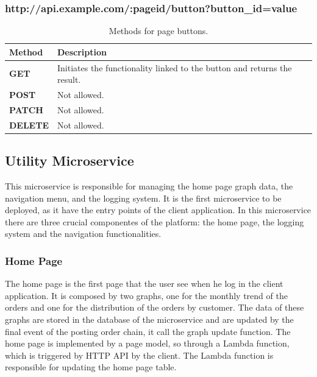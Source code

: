 \subsubsection{http://api.example.com/:pageid/button?button\_id=value}
\begin{table}
    \centering
    \begin{tabular}{|m{2cm}|m{10cm}|}
        \hline
        \textbf{Method} & \textbf{Description}                                   \\ \hline
        \textbf{GET}    &
        Initiates the functionality linked to the button and returns the result. \\ \hline
        \textbf{POST}   &
        Not allowed.                                                             \\ \hline
        \textbf{PATCH}  &
        Not allowed.                                                             \\ \hline
        \textbf{DELETE} &
        Not allowed.                                                             \\ \hline
    \end{tabular}
    \caption{Methods for page buttons.}
    \label{tab:api_rest_3}
\end{table}

\subsection{Utility Microservice}
This microservice is responsible for managing the home page graph data, the navigation menu, and the
logging system. It is the first microservice to be deployed, as it have the entry points of the
client application. In this microservice there are three crucial componentes of the platform: the
home page, the logging system and the navigation functionalities.

\subsubsection{Home Page}
The home page is the first page that the user see when he log in the client application. It is
composed by two graphs, one for the monthly trend of the orders and one for the distribution of the
orders by customer. The data of these graphs are stored in the database of the microservice and are
updated by the final event of the posting order chain, it call the graph update function. The home
page is implemented by a page model, so through a Lambda function, which is triggered by HTTP API by
the client. The Lambda function is responsible for updating the home page table.

